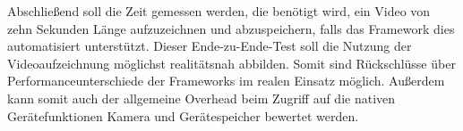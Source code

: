 Abschließend soll die Zeit gemessen werden, die benötigt wird, ein Video von zehn Sekunden Länge aufzuzeichnen und abzuspeichern, falls das Framework dies automatisiert unterstützt.
Dieser Ende-zu-Ende-Test soll die Nutzung der Videoaufzeichnung möglichst realitätsnah abbilden.
Somit sind Rückschlüsse über Performanceunterschiede der Frameworks im realen Einsatz möglich.
Außerdem kann somit auch der allgemeine Overhead beim Zugriff auf die nativen Gerätefunktionen Kamera und Gerätespeicher bewertet werden.